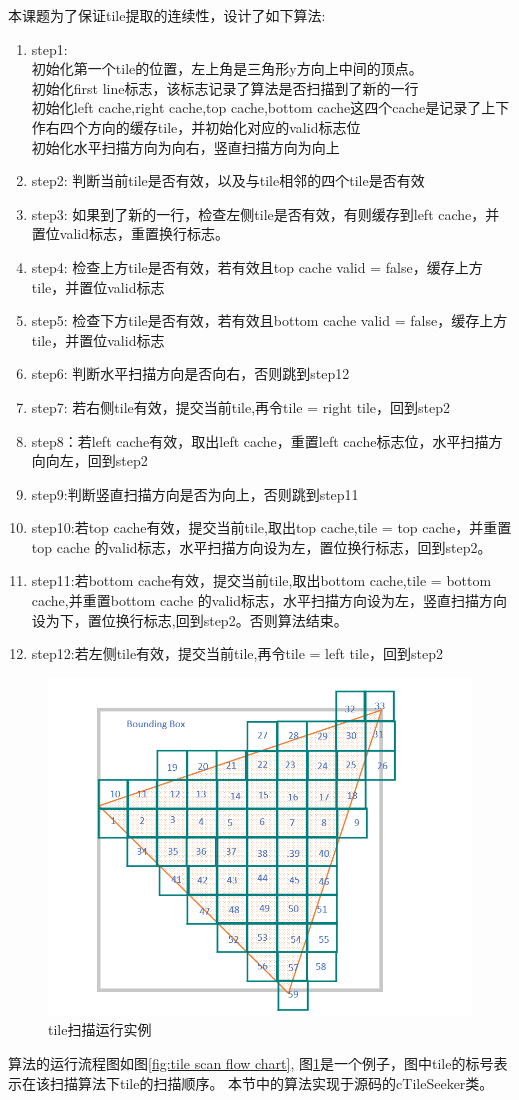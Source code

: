 本课题为了保证tile提取的连续性，设计了如下算法:
\begin{enumerate}
    \item step1:\\ 初始化第一个tile的位置，左上角是三角形y方向上中间的顶点。\\ 初始化first line标志，该标志记录了算法是否扫描到了新的一行 \\ 初始化left cache,right cache,top cache,bottom cache这四个cache是记录了上下作右四个方向的缓存tile，并初始化对应的valid标志位 \\ 初始化水平扫描方向为向右，竖直扫描方向为向上
    \item step2: 判断当前tile是否有效，以及与tile相邻的四个tile是否有效
    \item step3: 如果到了新的一行，检查左侧tile是否有效，有则缓存到left cache，并置位valid标志，重置换行标志。
    \item step4: 检查上方tile是否有效，若有效且top cache valid = false，缓存上方tile，并置位valid标志
    \item step5: 检查下方tile是否有效，若有效且bottom cache valid = false，缓存上方tile，并置位valid标志
    \item step6: 判断水平扫描方向是否向右，否则跳到step12
    \item step7: 若右侧tile有效，提交当前tile,再令tile = right tile，回到step2
    \item step8：若left cache有效，取出left cache，重置left cache标志位，水平扫描方向向左，回到step2
    \item step9:判断竖直扫描方向是否为向上，否则跳到step11
    \item step10:若top cache有效，提交当前tile,取出top cache,tile = top cache，并重置top cache 的valid标志，水平扫描方向设为左，置位换行标志，回到step2。
    \item step11:若bottom cache有效，提交当前tile,取出bottom cache,tile = bottom cache,并重置bottom cache 的valid标志，水平扫描方向设为左，竖直扫描方向设为下，置位换行标志,回到step2。否则算法结束。
    \item step12:若左侧tile有效，提交当前tile,再令tile = left tile，回到step2

\end{enumerate}
\begin{figure}[H]
    \centering
    \includegraphics[width=.5\linewidth]{figure/tileorder.png}
    \caption{\label{fig:tile order in a triangle}tile扫描运行实例}
\end{figure}
算法的运行流程图如图\ref{fig:tile scan flow chart}, 图\ref{fig:tile order in a triangle}是一个例子，图中tile的标号表示在该扫描算法下tile的扫描顺序。
本节中的算法实现于源码的cTileSeeker类。






